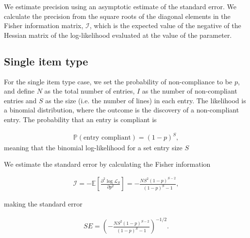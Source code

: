 \documentclass[aoas]{imsart}
\begin{document}
 {We estimate precision using an asymptotic estimate of the standard error. We calculate  the precision from the square roots of the diagonal elements in the Fisher information matrix, $\mathcal{I}$, which is the expected value of the negative of the Hessian matrix of the log-likelihood evaluated at the value of the parameter.}


\subsection{Single item type}
For the single item type case, we set the probability of non-compliance to be \(p\), and define \(N\) as the total number of entries, \(I\) as the number of  {non-compliant entries} and \(S\) as the size (i.e. the number of lines) in each entry. The likelihood is a binomial distribution, where the outcome is  {the discovery of a non-compliant entry}. The probability that an entry is  {compliant} is

\begin{align}
\mathbb{P}(\text{entry compliant}) = (1-p)^S,
\end{align}
meaning that the binomial log-likelihood for a set entry size $S$  

We estimate the standard error by calculating the Fisher information

\begin{align}
\mathcal{I} = -\mathbb{E}\left[\frac{\partial^2 \log\mathcal{L}_S}{\partial p^2}\right]=
 -\frac{NS^2(1-p)^{S-2}}{(1-p)^S-1}, \label{eq:fisher_information}
\end{align}

making the standard error

\begin{align}
SE = \left(-\frac{NS^2(1-p)^{S-2}}{(1-p)^S-1}\right)^{-1/2}. \label{eq:general_SE_calc}
\end{align}
\end{document}

